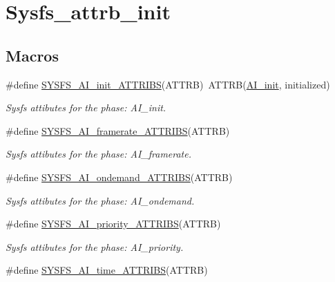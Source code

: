 \hypertarget{group__sysfs__attrb__init}{}\section{Sysfs\+\_\+attrb\+\_\+init}
\label{group__sysfs__attrb__init}
\subsection*{Macros}
\begin{DoxyCompactItemize}
\item 
\#define \hyperlink{group__sysfs__attrb__init_gac8d2c69a96b1110b2a84d9989e6ac890}{S\+Y\+S\+F\+S\+\_\+\+A\+I\+\_\+init\+\_\+\+A\+T\+T\+R\+I\+BS}(A\+T\+T\+RB)~A\+T\+T\+RB(\hyperlink{AI__gov__phases_8h_a59664fef4d2987410ea13b917756d6aca4469416d883468c62e85fa1412644678}{A\+I\+\_\+init}, initialized)
\begin{DoxyCompactList}\small\item\em Sysfs attibutes for the phase\+: A\+I\+\_\+init. \end{DoxyCompactList}\item 
\#define \hyperlink{group__sysfs__attrb__init_ga081f30ac6549e4ea9c45c9b37849849f}{S\+Y\+S\+F\+S\+\_\+\+A\+I\+\_\+framerate\+\_\+\+A\+T\+T\+R\+I\+BS}(A\+T\+T\+RB)
\begin{DoxyCompactList}\small\item\em Sysfs attibutes for the phase\+: A\+I\+\_\+framerate. \end{DoxyCompactList}\item 
\#define \hyperlink{group__sysfs__attrb__init_gac46c6acb492c013e3a484aca4b53f5ab}{S\+Y\+S\+F\+S\+\_\+\+A\+I\+\_\+ondemand\+\_\+\+A\+T\+T\+R\+I\+BS}(A\+T\+T\+RB)
\begin{DoxyCompactList}\small\item\em Sysfs attibutes for the phase\+: A\+I\+\_\+ondemand. \end{DoxyCompactList}\item 
\#define \hyperlink{group__sysfs__attrb__init_gad9f86b9d176151028e5eaa4bc9ff0f84}{S\+Y\+S\+F\+S\+\_\+\+A\+I\+\_\+priority\+\_\+\+A\+T\+T\+R\+I\+BS}(A\+T\+T\+RB)
\begin{DoxyCompactList}\small\item\em Sysfs attibutes for the phase\+: A\+I\+\_\+priority. \end{DoxyCompactList}\item 
\#define \hyperlink{group__sysfs__attrb__init_ga28216f1efe25676be61a0b585d8db84d}{S\+Y\+S\+F\+S\+\_\+\+A\+I\+\_\+time\+\_\+\+A\+T\+T\+R\+I\+BS}(A\+T\+T\+RB)

\end{DoxyCompactItemize}
